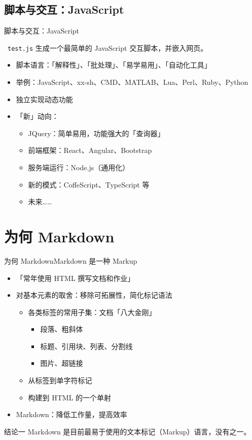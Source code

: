 \documentclass{beamer}
\begin{document}
\subsection{脚本与交互：JavaScript}
\begin{frame}{脚本与交互：JavaScript}
\begin{block}{\faCode\ \texttt{test.js}}
生成一个最简单的 JavaScript 交互脚本，并嵌入网页。
\end{block}

\pause
\begin{itemize}
    \item 脚本语言：「解释性」、「批处理」、「易学易用」、「自动化工具」
    \item 举例：JavaScript、xx-sh、CMD、MATLAB、Lua、Perl、Ruby、Python
    \item 独立实现动态功能
    \item 「新」动向：
    \begin{itemize}
        \item JQuery：简单易用，功能强大的「查询器」
        \item 前端框架：React、Angular、Bootstrap
        \item 服务端运行：Node.js（通用化）
        \item 新的模式：CoffeScript、TypeScript 等
        \item 未来……
    \end{itemize}
\end{itemize}
\end{frame}

\section{为何 Markdown}
\begin{frame}{为何 Markdown}{Markdown 是一种 Markup}
\begin{itemize}
    \item 「常年使用 HTML 撰写文档和作业」
    \item 对基本元素的取舍：移除可拓展性，简化标记语法
    \begin{itemize}
        \item 各类标签的常用子集：文档「八大金刚」
        \begin{itemize}
            \item 段落、粗斜体
            \item 标题、引用块、列表、分割线
            \item 图片、超链接
        \end{itemize}
        \item 从标签到单字符标记
        \item 构建到 HTML 的一个单射
    \end{itemize}
    \item Markdown：降低工作量，提高效率
\end{itemize}

\begin{alertblock}{结论一}
Markdown 是目前最易于使用的文本标记（Markup）语言，没有之一。
\end{alertblock}
\end{frame}
\end{document}
